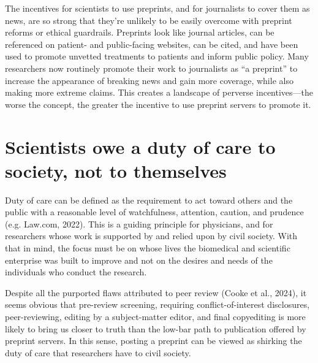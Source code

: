 \documentclass[authordate, perspective]{jote-new-article}
\begin{document}
	The incentives for scientists to use preprints, and for journalists to cover them as news, are so strong that they're unlikely to be easily overcome with preprint reforms or ethical guardrails. Preprints look like journal articles, can be referenced on patient- and public-facing websites, can be cited, and have been used to promote unvetted treatments to patients and inform public policy. Many researchers now routinely promote their work to journalists as “a preprint” to increase the appearance of breaking news and gain more coverage, while also making more extreme claims. This creates a landscape of perverse incentives—the worse the concept, the greater the incentive to use preprint servers to promote it.







	\section{Scientists owe a duty of care to society, not to themselves}







	Duty of care can be defined as the requirement to act toward others and the public with a reasonable level of watchfulness, attention, caution, and prudence (e.g. Law.com, 2022). This is a guiding principle for physicians, and for researchers whose work is supported by and relied upon by civil society. With that in mind, the focus must be on whose lives the biomedical and scientific enterprise was built to improve and not on the desires and needs of the individuals who conduct the research.







	Despite all the purported flaws attributed to peer review (Cooke et al., 2024), it seems obvious that pre-review screening, requiring conflict-of-interest disclosures, peer-reviewing, editing by a subject-matter editor, and final copyediting is more likely to bring us closer to truth than the low-bar path to publication offered by preprint servers. In this sense, posting a preprint can be viewed as shirking the duty of care that researchers have to civil society.
\end{document}
